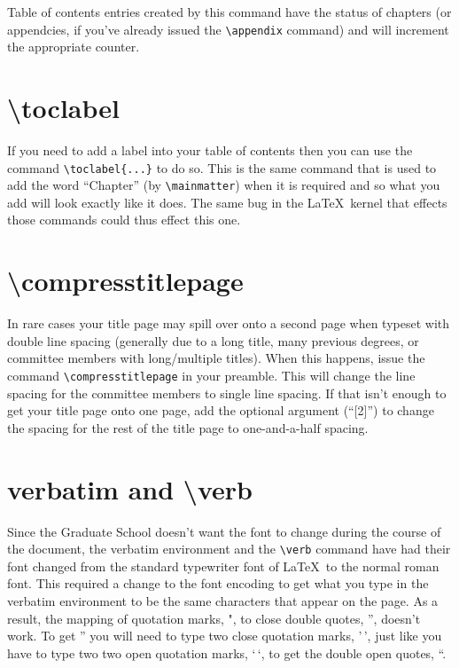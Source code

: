 Table of contents entries created by this command have the status of chapters (or appendcies, if you've already issued the \verb=\appendix= command) and will increment the appropriate counter.

\section{\textbackslash toclabel}
If you need to add a label into your table of contents then you can use the command \verb=\toclabel{...}= to do so.  This is the same command that is used to add the word ``Chapter'' (by \verb=\mainmatter=) when it is required and so what you add will look exactly like it does.  The same bug in the \LaTeX\ kernel that effects those commands could thus effect this one.

\section{\textbackslash compresstitlepage}
In rare cases your title page may spill over onto a second page when typeset with double line spacing (generally due to a long title, many previous degrees, or committee members with long/multiple titles).  When this happens, issue the command \verb=\compresstitlepage= in your preamble.  This will change the line spacing for the committee members to single line spacing.  If that isn't enough to get your title page onto one page, add the optional argument (``[2]'') to change the spacing for the rest of the title page to one-and-a-half spacing.

\section{verbatim and \textbackslash verb}
Since the Graduate School doesn't want the font to change during the course of the document, the verbatim environment and the \verb=\verb= command have had their font changed from the standard typewriter font of \LaTeX\ to the normal roman font.  This required a change to the font encoding to get what you type in the verbatim environment to be the same characters that appear on the page.  As a result, the mapping of quotation marks, ", to close double quotes, '', doesn't work.  To get '' you will need to type two close quotation marks, '\,', just like you have to type two two open quotation marks, `\,`, to get the double open quotes, ``.

